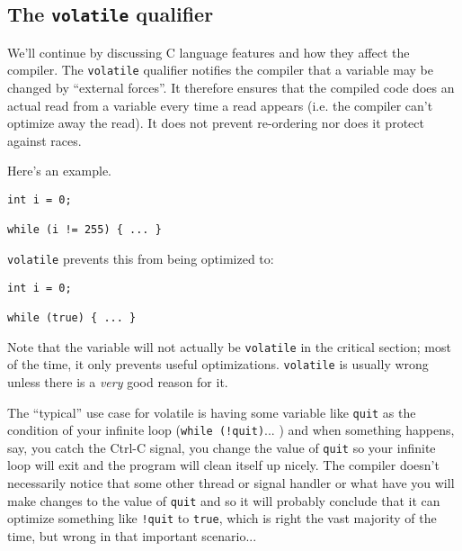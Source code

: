 \subsection*{The {\tt volatile} qualifier}
We'll continue by discussing C language features and how they affect
the compiler. The {\tt volatile} qualifier notifies the compiler that
a variable may be changed by ``external forces''. It therefore ensures
that the compiled code does an actual read from a variable every time
a read appears (i.e. the compiler can't optimize away the read). It
does not prevent re-ordering nor does it protect against races.

Here's an example.
  \begin{verbatim}
int i = 0;

while (i != 255) { ... }
  \end{verbatim}

{\tt volatile} prevents this from being optimized to:

  \begin{verbatim}
int i = 0;

while (true) { ... }
  \end{verbatim}

Note that the variable will not actually be {\tt volatile} in the
critical section; most of the time, it only prevents useful
optimizations. {\tt volatile} is usually wrong unless there is a
\emph{very} good reason for it.

The ``typical'' use case for volatile is having some variable like \texttt{quit} as the condition of your infinite loop (\texttt{while (!quit)}... ) and when something happens, say, you catch the Ctrl-C signal, you change the value of \texttt{quit} so your infinite loop will exit and the program will clean itself up nicely. The compiler doesn't necessarily notice that some other thread or signal handler or what have you will make changes to the value of \texttt{quit} and so it will probably conclude that it can optimize something like \texttt{!quit} to \texttt{true}, which is right the vast majority of the time, but wrong in that important scenario...

  



